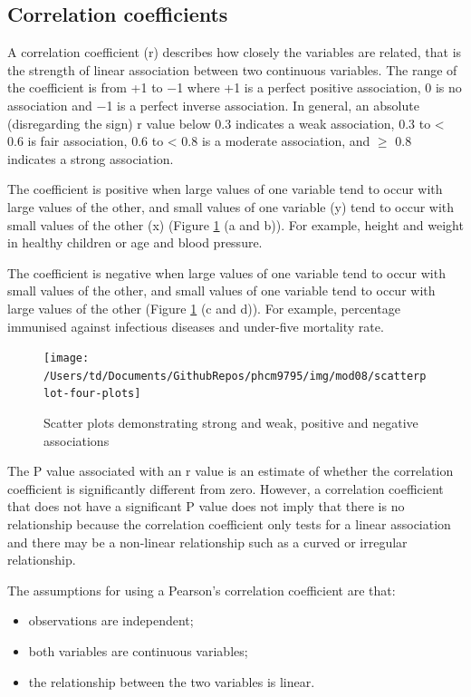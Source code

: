 \documentclass[
]{memoir}
\providecommand{\tightlist}{%
  \setlength{\itemsep}{0pt}\setlength{\parskip}{0pt}}
\begin{document}
\hypertarget{correlation-coefficients}{%
\subsection{Correlation coefficients}\label{correlation-coefficients}}

A correlation coefficient (r) describes how closely the variables are related, that is the strength of linear association between two continuous variables. The range of the coefficient is from +1 to −1 where +1 is a perfect positive association, 0 is no association and −1 is a perfect inverse association. In general, an absolute (disregarding the sign) r value below 0.3 indicates a weak association, 0.3 to \textless{} 0.6 is fair association, 0.6 to \textless{} 0.8 is a moderate association, and \(\ge\) 0.8 indicates a strong association.

The coefficient is positive when large values of one variable tend to occur with large values of the other, and small values of one variable (y) tend to occur with small values of the other (x) (Figure \ref{fig:scatter-plot-four} (a and b)). For example, height and weight in healthy children or age and blood pressure.

The coefficient is negative when large values of one variable tend to occur with small values of the other, and small values of one variable tend to occur with large values of the other (Figure \ref{fig:scatter-plot-four} (c and d)). For example, percentage immunised against infectious diseases and under-five mortality rate.

\begin{figure}
\texttt{[image: /Users/td/Documents/GithubRepos/phcm9795/img/mod08/scatterplot-four-plots]} \caption{Scatter plots demonstrating strong and weak, positive and negative associations}\label{fig:scatter-plot-four}
\end{figure}

The P value associated with an r value is an estimate of whether the correlation coefficient is significantly different from zero. However, a correlation coefficient that does not have a significant P value does not imply that there is no relationship because the correlation coefficient only tests for a linear association and there may be a non-linear relationship such as a curved or irregular relationship.

The assumptions for using a Pearson's correlation coefficient are that:

\begin{itemize}
\tightlist
\item
  observations are independent;
\item
  both variables are continuous variables;
\item
  the relationship between the two variables is linear.
\end{itemize}
\end{document}

